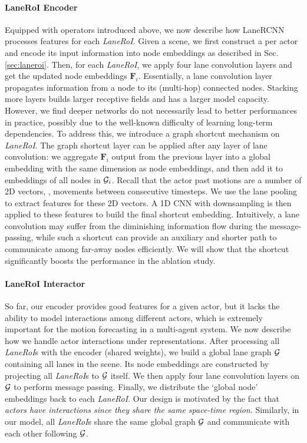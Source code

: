 \paragraph{LaneRoI Encoder}
Equipped with operators introduced above, we now describe how LaneRCNN processes
features for each \textit{LaneRoI}. Given a scene, we first
construct a \ROI per actor and encode its input information into node
embeddings as described in Sec. \ref{sec:laneroi}. Then, for each \textit{LaneRoI}, we apply
four lane convolution layers and get the updated node embeddings
$\mathbf{F}_i$.
Essentially, a lane convolution layer propagates information from a node to
its (multi-hop) connected nodes. Stacking more layers builds larger receptive
fields and has a larger model capacity. However, we find deeper
networks do not necessarily lead to better performances in practice, possibly due to the well-known
difficulty of learning long-term dependencies. To address this, we introduce a
graph shortcut mechanism on \textit{LaneRoI}. 
The graph shortcut layer can be applied after any layer of lane convolution:
we aggregate $\mathbf{F}_i$ output from the previous layer into a global
embedding with the same dimension as node embeddings, and then add it to embeddings
of all nodes in $\mathcal{G}_i$.
Recall that the actor past motions are a number of 2D vectors, \ie, movements
between consecutive timesteps. We use the lane pooling to extract
features for these 2D vectors. A 1D CNN with downsampling is then applied to these features to
build the final shortcut embedding. Intuitively, a lane convolution may suffer
from the diminishing information flow during the message-passing, while such
a shortcut can provide an auxiliary and shorter path to communicate among far-away nodes
efficiently. We will show that the shortcut significantly boosts the performance in the ablation study.



\paragraph{LaneRoI Interactor}
So far, our \ROI encoder provides good features for a given actor, but it
lacks the ability to model interactions among different actors, which is
extremely important for the motion forecasting in a multi-agent system. We now
describe  how we handle actor interactions under \ROI representations.
After processing all \textit{LaneRoI}s with the \ROI encoder (shared weights), we build a global lane graph
$\mathcal{G}$ containing all lanes in the scene. Its node embeddings are constructed by
projecting all \textit{LaneRoI}s to $\mathcal{G}$ itself. We then apply four lane convolution layers on $\mathcal{G}$ to perform message passing. Finally, we distribute the
`global node' embeddings back to each \textit{LaneRoI}. Our design is motivated by the fact
that \textit{actors have interactions since they share the same space-time region}. 
Similarly, in our model, all \textit{LaneRoI}s share the same global graph $\mathcal{G}$ and
communicate with each other following $\mathcal{G}$.

